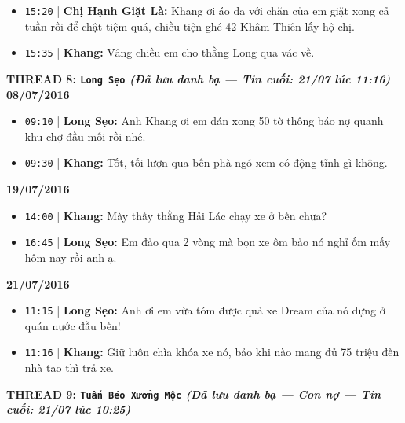 \documentclass[12pt,a4paper]{article}
\begin{document}
\begin{itemize}[leftmargin=*, itemsep=2pt, topsep=2pt, parsep=0pt]
  \item \texttt{15:20} | \textbf{Chị Hạnh Giặt Là:} Khang ơi áo da với chăn của em giặt xong cả tuần rồi để chật tiệm quá, chiều tiện ghé 42 Khâm Thiên lấy hộ chị.
  \item \texttt{15:35} | \textbf{Khang:} Vâng chiều em cho thằng Long qua vác về.


\end{itemize}

\vspace{0.3cm}\noindent\textbf{\large  THREAD 8: \texttt{Long Sẹo} \textit{(Đã lưu danh bạ — Tin cuối: 21/07 lúc 11:16)}}\\[0.15cm]


\textbf{08/07/2016}

\begin{itemize}[leftmargin=*, itemsep=2pt, topsep=2pt, parsep=0pt]
  \item \texttt{09:10} | \textbf{Long Sẹo:} Anh Khang ơi em dán xong 50 tờ thông báo nợ quanh khu chợ đầu mối rồi nhé.
  \item \texttt{09:30} | \textbf{Khang:} Tốt, tối lượn qua bến phà ngó xem có động tĩnh gì không.

\end{itemize}
\textbf{19/07/2016}

\begin{itemize}[leftmargin=*, itemsep=2pt, topsep=2pt, parsep=0pt]
  \item \texttt{14:00} | \textbf{Khang:} Mày thấy thằng Hải Lác chạy xe ở bến chưa?
  \item \texttt{16:45} | \textbf{Long Sẹo:} Em đảo qua 2 vòng mà bọn xe ôm bảo nó nghỉ ốm mấy hôm nay rồi anh ạ.

\end{itemize}
\textbf{21/07/2016}

\begin{itemize}[leftmargin=*, itemsep=2pt, topsep=2pt, parsep=0pt]
  \item \texttt{11:15} | \textbf{Long Sẹo:} Anh ơi em vừa tóm được quả xe Dream của nó dựng ở quán nước đầu bến!
  \item \texttt{11:16} | \textbf{Khang:} Giữ luôn chìa khóa xe nó, bảo khi nào mang đủ 75 triệu đến nhà tao thì trả xe.


\end{itemize}

\vspace{0.3cm}\noindent\textbf{\large  THREAD 9: \texttt{Tuấn Béo Xưởng Mộc} \textit{(Đã lưu danh bạ — Con nợ — Tin cuối: 21/07 lúc 10:25)}}\\[0.15cm]
\end{document}
